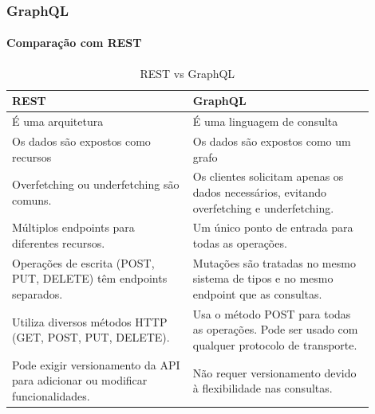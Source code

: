 \documentclass[
	9pt, %
	t, %
]{beamer}
\begin{document}
\begin{frame}
	\frametitle{GraphQL}
	\framesubtitle{Comparação com REST}

	\begin{table}
		\renewcommand{\arraystretch}{1.25} %
		\begin{tabular}{|p{0.45\linewidth}|p{0.45\linewidth}|}
			\hline
			\textbf{REST}                                                                 & \textbf{GraphQL}                                                                                \\ \hline
			É uma arquitetura                                                             & É uma linguagem de consulta                                                                     \\ \hline
			Os dados são expostos como recursos                                           & Os dados são expostos como um grafo                                                             \\ \hline
			Overfetching ou underfetching são comuns.                                     & Os clientes solicitam apenas os dados necessários, evitando overfetching e underfetching.       \\ \hline
			Múltiplos endpoints para diferentes recursos.                                 & Um único ponto de entrada para todas as operações.                                              \\ \hline
			Operações de escrita (POST, PUT, DELETE) têm endpoints separados.             & Mutações são tratadas no mesmo sistema de tipos e no mesmo endpoint que as consultas.           \\ \hline
			Utiliza diversos métodos HTTP (GET, POST, PUT, DELETE).                       & Usa o método POST para todas as operações. Pode ser usado com qualquer protocolo de transporte. \\ \hline
			Pode exigir versionamento da API para adicionar ou modificar funcionalidades. & Não requer versionamento devido à flexibilidade nas consultas.                                  \\ \hline
		\end{tabular}
		\caption{REST vs GraphQL}
		\label{tab:rest_graphql}

	\end{table}

\end{frame}
\end{document}
